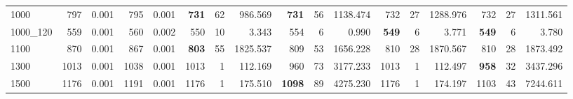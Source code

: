 \begin{table}[h]
{\begin{tabular}{|l|rr|rr|rrr|rrr|rrr|rrr|}
1000 & 797 & 0.001 & 795 & 0.001 & \textbf{731} & 62 & 986.569 & \textbf{731} & 56 & 1138.474 & 732 & 27 & 1288.976 & 732 & 27 & 1311.561 \\
1000\_120 & 559 & 0.001 & 560 & 0.002 & 550 & 10 & 3.343 & 554 & 6 & 0.990 & \textbf{549} & 6 & 3.771 & \textbf{549} & 6 & 3.780 \\
1100 & 870 & 0.001 & 867 & 0.001 & \textbf{803} & 55 & 1825.537 & 809 & 53 & 1656.228 & 810 & 28 & 1870.567 & 810 & 28 & 1873.492 \\
1300 & 1013 & 0.001 & 1038 & 0.001 & 1013 & 1 & 112.169 & 960 & 73 & 3177.233 & 1013 & 1 & 112.497 & \textbf{958} & 32 & 3437.296 \\
1500 & 1176 & 0.001 & 1191 & 0.001 & 1176 & 1 & 175.510 & \textbf{1098} & 89 & 4275.230 & 1176 & 1 & 174.197 & 1103 & 43 & 7244.611 \\
\hline
\end{tabular}%
}
\label{tab:resultados-parte2}
\end{table}